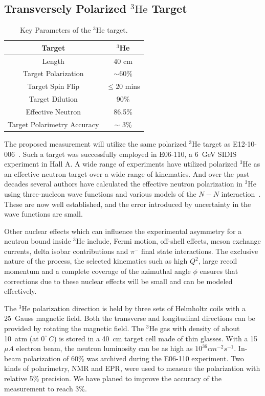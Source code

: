 \subsection {Transversely Polarized $\mathrm{^{3}He}$ Target}
\begin{table}[!ht]
\centering
\begin{tabular}{|c|c|}
\hline
Target                       & $^3$He              \\\hline 
Length                       & 40 cm               \\\hline          
Target Polarization          & $\sim$60\%          \\\hline 
Target Spin Flip             & $\leq$20 mins       \\\hline 
Target Dilution              & 90\%                \\\hline
Effective Neutron            & 86.5\%              \\\hline
Target Polarimetry Accuracy  & $\sim$ 3\%          \\\hline
\end{tabular}
\caption{\footnotesize{Key Parameters of the $\mathrm{^{3}He}$
    target.}\label{table:target}}
\end{table} 
The proposed measurement will utilize the same polarized $\mathrm{^{3}He}$
target as E12-10-006~\cite{solid:e12-10-006}. Such a target was successfully employed
in E06-110, a 6~GeV SIDIS experiment in Hall A. 
A wide range of experiments have utilized polarized $^3$He as an effective
neutron target over a wide range of kinematics. And over the past decades
several authors have calculated the effective neutron polarization in $^3$He
using three-nucleon wave functions and various models of the $N-N$
interaction~\cite{3hepol1}.  These are now well established, and the error
introduced by uncertainty in the wave functions are small.

Other nuclear effects which can influence the experimental asymmetry for a
neutron bound inside $^3$He include, Fermi motion, off-shell effects, meson
exchange currents, delta isobar contributions and $\pi^-$ final state
interactions. The exclusive nature of the process, the selected kinematics such
as high $Q^2$, large recoil momentum and a complete coverage of the azimuthal
angle $\phi$ ensures that corrections due to these nuclear effects will be
small and can be modeled effectively.

The $\mathrm{^{3}He}$ polarization direction is held by three sets of Helmholtz
coils with a 25~Gauss magnetic field. Both the transverse and longitudinal
directions can be provided by rotating the magnetic field. The
$\mathrm{^{3}He}$ gas with density of about 10~atm (at $0^{\circ}~C$) is stored
in a 40~cm target cell made of thin glasses. With a 15~$\mu A$ electron beam,
the neutron luminosity can be as high as $10^{36} cm^{-2}s^{-1}$. In-beam
polarization of 60\% was archived during the E06-110 experiment. Two kinds of
polarimetry, NMR and EPR, were used to measure the polarization with relative
5\% precision. We have planed to improve the accuracy of the measurement to
reach 3\%.

